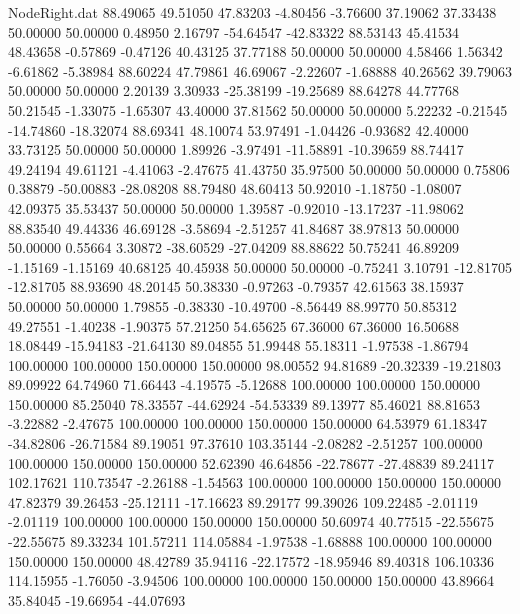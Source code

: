 \begin{filecontents}{NodeRight.dat}
  88.49065   49.51050   47.83203    -4.80456   -3.76600   37.19062   37.33438   50.00000   50.00000    0.48950    2.16797  -54.64547  -42.83322
  88.53143   45.41534   48.43658    -0.57869   -0.47126   40.43125   37.77188   50.00000   50.00000    4.58466    1.56342   -6.61862   -5.38984
  88.60224   47.79861   46.69067    -2.22607   -1.68888   40.26562   39.79063   50.00000   50.00000    2.20139    3.30933  -25.38199  -19.25689
  88.64278   44.77768   50.21545    -1.33075   -1.65307   43.40000   37.81562   50.00000   50.00000    5.22232   -0.21545  -14.74860  -18.32074
  88.69341   48.10074   53.97491    -1.04426   -0.93682   42.40000   33.73125   50.00000   50.00000    1.89926   -3.97491  -11.58891  -10.39659
  88.74417   49.24194   49.61121    -4.41063   -2.47675   41.43750   35.97500   50.00000   50.00000    0.75806    0.38879  -50.00883  -28.08208
  88.79480   48.60413   50.92010    -1.18750   -1.08007   42.09375   35.53437   50.00000   50.00000    1.39587   -0.92010  -13.17237  -11.98062
  88.83540   49.44336   46.69128    -3.58694   -2.51257   41.84687   38.97813   50.00000   50.00000    0.55664    3.30872  -38.60529  -27.04209
  88.88622   50.75241   46.89209    -1.15169   -1.15169   40.68125   40.45938   50.00000   50.00000   -0.75241    3.10791  -12.81705  -12.81705
  88.93690   48.20145   50.38330    -0.97263   -0.79357   42.61563   38.15937   50.00000   50.00000    1.79855   -0.38330  -10.49700   -8.56449
  88.99770   50.85312   49.27551    -1.40238   -1.90375   57.21250   54.65625   67.36000   67.36000   16.50688   18.08449  -15.94183  -21.64130
  89.04855   51.99448   55.18311    -1.97538   -1.86794  100.00000  100.00000  150.00000  150.00000   98.00552   94.81689  -20.32339  -19.21803
  89.09922   64.74960   71.66443    -4.19575   -5.12688  100.00000  100.00000  150.00000  150.00000   85.25040   78.33557  -44.62924  -54.53339
  89.13977   85.46021   88.81653    -3.22882   -2.47675  100.00000  100.00000  150.00000  150.00000   64.53979   61.18347  -34.82806  -26.71584
  89.19051   97.37610  103.35144    -2.08282   -2.51257  100.00000  100.00000  150.00000  150.00000   52.62390   46.64856  -22.78677  -27.48839
  89.24117  102.17621  110.73547    -2.26188   -1.54563  100.00000  100.00000  150.00000  150.00000   47.82379   39.26453  -25.12111  -17.16623
  89.29177   99.39026  109.22485    -2.01119   -2.01119  100.00000  100.00000  150.00000  150.00000   50.60974   40.77515  -22.55675  -22.55675
  89.33234  101.57211  114.05884    -1.97538   -1.68888  100.00000  100.00000  150.00000  150.00000   48.42789   35.94116  -22.17572  -18.95946
  89.40318  106.10336  114.15955    -1.76050   -3.94506  100.00000  100.00000  150.00000  150.00000   43.89664   35.84045  -19.66954  -44.07693

\end{filecontents}
